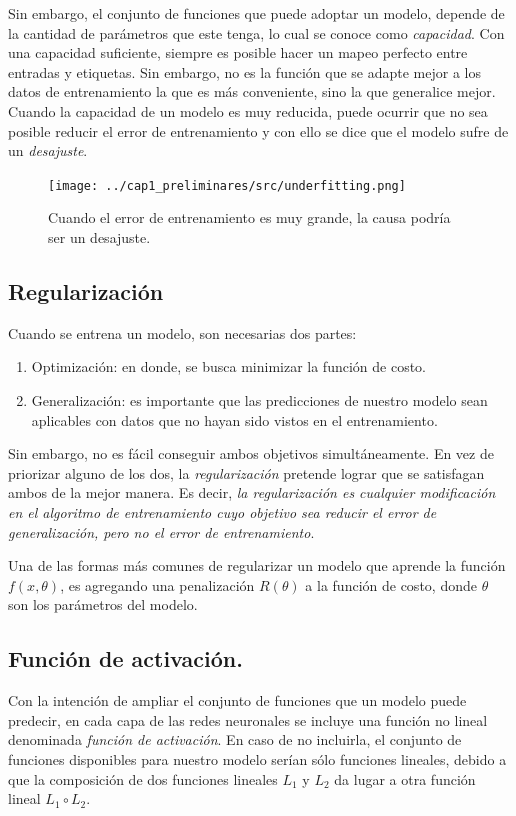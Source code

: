     Sin embargo, el conjunto de funciones que puede adoptar un modelo, depende de la cantidad de parámetros que este tenga, lo cual se conoce como \textsl{capacidad}. Con una capacidad suficiente, siempre es posible hacer un mapeo perfecto entre entradas y etiquetas. Sin embargo, no es la función que se adapte mejor a los datos de entrenamiento la que es más conveniente, sino la que generalice mejor. Cuando la capacidad de un modelo es muy reducida, puede ocurrir que no sea posible reducir el error de entrenamiento y con ello se dice que el modelo sufre de un \textsl{desajuste}.
    \begin{figure}[H]
        \centering
        \texttt{[image: ../cap1\_preliminares/src/underfitting.png]}
        \caption{Cuando el error de entrenamiento es muy grande, la causa podría ser un desajuste.}
    \end{figure}

    \subsection{Regularización}
    Cuando se entrena un modelo, son necesarias dos partes: 
    \begin{enumerate}
        \item Optimización: en donde, se busca minimizar la función de costo.
        \item Generalización: es importante que las predicciones de nuestro modelo sean aplicables con datos que no hayan sido vistos en el entrenamiento.
    \end{enumerate}
    Sin embargo, no es fácil conseguir ambos objetivos simultáneamente. En vez de priorizar alguno de los dos, la \textsl{regularización} pretende lograr que se satisfagan ambos de la mejor manera. Es decir, \textsl{la regularización es cualquier modificación en el algoritmo de entrenamiento cuyo objetivo sea reducir el error de generalización, pero no el error de entrenamiento}.
        
    Una de las formas más comunes de regularizar un modelo que aprende la función $f(x, \theta)$, es agregando una penalización $R(\theta)$ a la función de costo, donde $\theta$ son los parámetros del modelo.
    \subsection{Función de activación.
    }
    Con la intención de ampliar el conjunto de funciones que un modelo puede predecir, en cada capa de las redes neuronales se incluye una función no lineal denominada \textsl{función de activación}. En caso de no incluirla, el conjunto de funciones disponibles para nuestro modelo serían sólo funciones lineales, debido a que la composición de dos funciones lineales $L_1$ y $L_2$ da lugar a otra función lineal $L_1 \circ L_2$.

